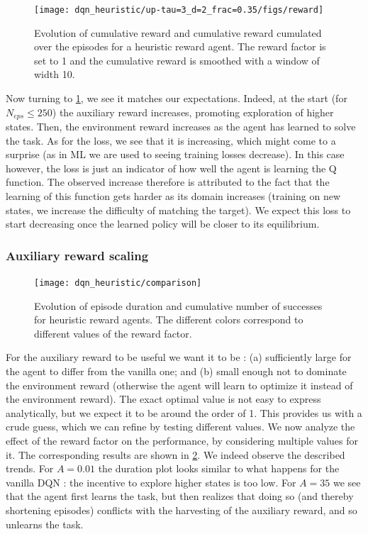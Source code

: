 \documentclass[a4paper, 12pt,oneside]{article}
\begin{document}
        \begin{figure}
            \centering
            \vspace{-2em}
            \texttt{[image: dqn\_heuristic/up-tau=3\_d=2\_frac=0.35/figs/reward]}
            \caption{Evolution of cumulative reward and cumulative reward cumulated over the episodes for a heuristic reward agent. The reward factor is set to 1 and the cumulative reward is smoothed with a window of width 10.}
            \label{fig:dqn-heuristic-frac=3.5-reward}
        \end{figure}
        Now turning to \ref{fig:dqn-heuristic-frac=3.5-reward}, we see it matches our expectations. Indeed, at the start (for $N_{eps}\le 250$) the auxiliary reward increases, promoting exploration of higher states. Then, the environment reward increases as the agent has learned to solve the task. 
        As for the loss, we see that it is increasing, which might come to a surprise (as in ML we are used to seeing training losses decrease). In this case however, the loss is just an indicator of how well the agent is learning the Q function. The observed increase therefore is attributed to the fact that the learning of this function gets harder as its domain increases (training on new states, we increase the difficulty of matching the target). We expect this loss to start decreasing once the learned policy will be closer to its equilibrium. 
        \subsubsection{Auxiliary reward scaling}
        \begin{figure}
            \centering
            \vspace{-1em}
            \texttt{[image: dqn\_heuristic/comparison]}
            \caption{Evolution of episode duration and cumulative number of successes for heuristic reward agents. The different colors correspond to different values of the reward factor.}
            \label{fig:dqn-heuristic-comparison}
        \end{figure}
        For the auxiliary reward to be useful we want it to be : (a) sufficiently large for the agent to differ from the vanilla one; and (b) small enough not to dominate the environment reward (otherwise the agent will learn to optimize it instead of the environment reward). The exact optimal value is not easy to express analytically, but we expect it to be around the order of 1. This provides us with a crude guess, which we can refine by testing different values.
        We now analyze the effect of the reward factor on the performance, by considering multiple values for it. The corresponding results are shown in \ref{fig:dqn-heuristic-comparison}. We indeed observe the described trends. For $A=0.01$ the duration plot looks similar to what happens for the vanilla DQN : the incentive to explore higher states is too low. For $A=35$ we see that the agent first learns the task, but then realizes that doing so (and thereby shortening episodes) conflicts with the harvesting of the auxiliary reward, and so unlearns the task.
\end{document}
